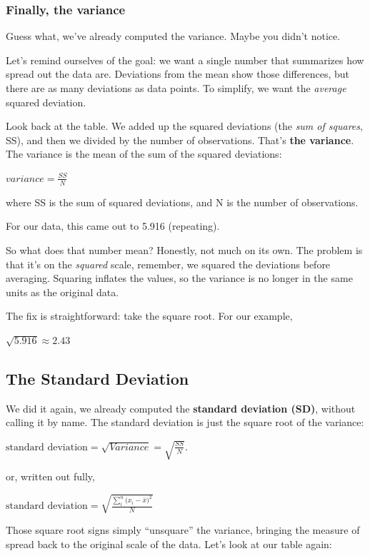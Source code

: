 \documentclass[
  letterpaper,
  DIV=11,
  numbers=noendperiod]{scrreprt}
\begin{document}
\subsubsection{Finally, the variance}\label{finally-the-variance}

Guess what, we've already computed the variance. Maybe you didn't
notice.

Let's remind ourselves of the goal: we want a single number that
summarizes how spread out the data are. Deviations from the mean show
those differences, but there are as many deviations as data points. To
simplify, we want the \emph{average} squared deviation.

Look back at the table. We added up the squared deviations (the
\emph{sum of squares}, SS), and then we divided by the number of
observations. That's \textbf{the variance}. The variance is the mean of
the sum of the squared deviations:

\(variance = \frac{SS}{N}\)

where SS is the sum of squared deviations, and N is the number of
observations.

For our data, this came out to 5.916 (repeating).

So what does that number mean? Honestly, not much on its own. The
problem is that it's on the \emph{squared} scale, remember, we squared
the deviations before averaging. Squaring inflates the values, so the
variance is no longer in the same units as the original data.

The fix is straightforward: take the square root. For our example,

\(\sqrt{5.916} ≈2.43\)

\subsection{The Standard Deviation}\label{the-standard-deviation}

We did it again, we already computed the \textbf{standard deviation
(SD)}, without calling it by name. The standard deviation is just the
square root of the variance:

\(\text{standard deviation} = \sqrt{Variance} = \sqrt{\frac{SS}{N}}\).

or, written out fully,

\(\text{standard deviation} = \sqrt{\frac{\sum_{i}^{n}({x_{i}-\bar{x})^2}}{N}}\)

Those square root signs simply ``unsquare'' the variance, bringing the
measure of spread back to the original scale of the data. Let's look at
our table again:
\end{document}
